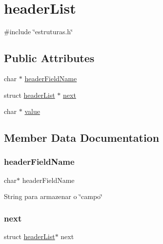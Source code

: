 \hypertarget{structheaderList}{}\section{header\+List}
\label{structheaderList}


{\ttfamily \#include \char`\"{}estruturas.\+h\char`\"{}}

\subsection*{Public Attributes}
\begin{DoxyCompactItemize}
\item 
char $\ast$ \hyperlink{structheaderList_a4dc1c5bcd4aa9ddf9ad07b391da220fe}{header\+Field\+Name}
\item 
struct \hyperlink{structheaderList}{header\+List} $\ast$ \hyperlink{structheaderList_a962654f7b063920114c6fea7fb815162}{next}
\item 
char $\ast$ \hyperlink{structheaderList_a4e9aec275e566b978a3ccb4e043d8c61}{value}
\end{DoxyCompactItemize}


\subsection{Member Data Documentation}
\mbox{\label{structheaderList_a4dc1c5bcd4aa9ddf9ad07b391da220fe}} 
\subsubsection{\texorpdfstring{header\+Field\+Name}{headerFieldName}}
{\footnotesize\ttfamily char$\ast$ header\+Field\+Name}

String para armazenar o \char`\"{}campo\char`\"{} \mbox{\label{structheaderList_a962654f7b063920114c6fea7fb815162}} 
\subsubsection{\texorpdfstring{next}{next}}
{\footnotesize\ttfamily struct \hyperlink{structheaderList}{header\+List}$\ast$ next}

